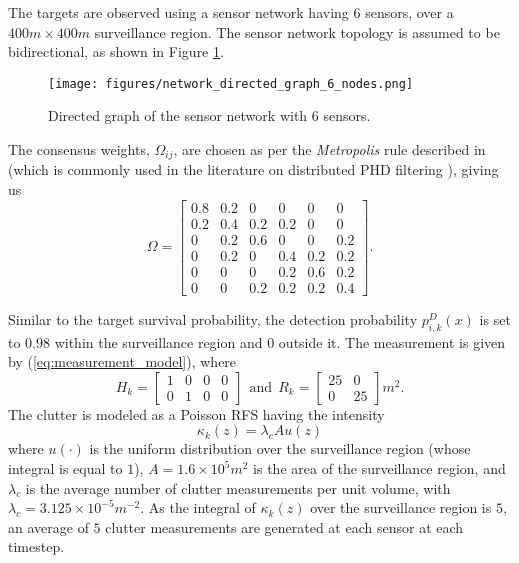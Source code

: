 The targets are observed using a sensor network having $6$ sensors, over a  $400m\times400m$ surveillance region. The sensor network topology is assumed to be bidirectional, as shown in Figure \ref{fig_network}. 
%
\begin{figure}[t]
\centering
    \texttt{[image: figures/network\_directed\_graph\_6\_nodes.png]}
    \caption{Directed graph of the sensor network with 6 sensors.} 
    \label{fig_network}
\end{figure}
The consensus weights, $\Omega_{ij}$, are chosen as per the \textit{Metropolis} rule described in \cite{xiao2006distributed} (which is commonly used in the literature on distributed PHD filtering \cite{li2018cardinality, li2020parallel}), giving us
\begin{equation}
    \Omega = \begin{bmatrix}
        0.8 & 0.2 & 0 & 0 & 0 & 0\\
        0.2 & 0.4 & 0.2 & 0.2 & 0 & 0\\
        0 & 0.2 & 0.6 & 0 & 0 & 0.2\\
        0 & 0.2 & 0 & 0.4 & 0.2 & 0.2\\
        0 & 0 & 0 & 0.2 & 0.6 & 0.2\\
        0 & 0 & 0.2 & 0.2 & 0.2 & 0.4
    \end{bmatrix}.
\end{equation}

Similar to the target survival probability, the detection probability $p_{i,k}^D(x)$ is set to $0.98$ within the surveillance region and $0$ outside it. The measurement is given by (\ref{eq:measurement_model}), where
\begin{equation}
    H_{k} = \begin{bmatrix}
        1 & 0 & 0 & 0\\
        0 & 1 & 0 & 0
    \end{bmatrix}\ \ \text{and}\ \ 
    R_{k} = \begin{bmatrix}
        25 & 0\\
        0 & 25
    \end{bmatrix}m^2.
\end{equation}
The clutter is modeled as a Poisson RFS having the intensity
\begin{equation}
    \kappa_{k}(z) = \lambda_{c} A u(z)
\end{equation}
where $u(\cdot)$ is the uniform distribution over the surveillance region (whose integral is equal to $1$), $A=1.6 \times 10^5 m^2$ is the area of the surveillance region, and $\lambda_{c}$ is the average number of clutter measurements per unit volume, with $\lambda_{c}=3.125\times10^{-5}m^{-2}$. As the integral of $\kappa_{k}(z)$ over the surveillance region is $5$, an average of $5$ clutter measurements are generated
at each sensor at each timestep.

